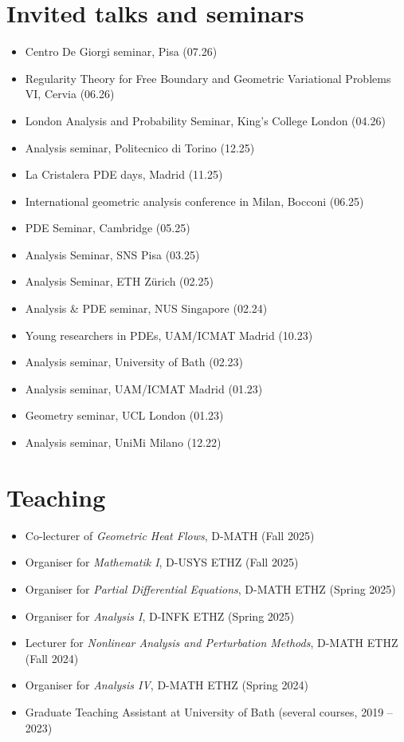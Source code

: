 \documentclass[a4paper,11pt]{article}
\newcommand{\changed}[1]{#1}
\begin{document}
\vspace{5mm}

\section*{Invited talks and seminars}
\noindent
\begin{itemize}
    \item \changed{Centro De Giorgi seminar, Pisa (07.26)}
    \item \changed{Regularity Theory for Free Boundary and Geometric Variational Problems VI, Cervia (06.26)}
    \item \changed{London Analysis and Probability Seminar, King's College London (04.26)}
    \item Analysis seminar, Politecnico di Torino (12.25)
    \item La Cristalera PDE days, Madrid (11.25)
    \item International geometric analysis conference in Milan, Bocconi (06.25)
    \item PDE Seminar, Cambridge (05.25)
    \item Analysis Seminar, SNS Pisa (03.25)
    \item Analysis Seminar, ETH Z\"urich (02.25)
    \item Analysis \& PDE seminar, NUS Singapore (02.24)
    \item Young researchers in PDEs, UAM/ICMAT Madrid (10.23)
    \item Analysis seminar, University of Bath (02.23)
    \item Analysis seminar, UAM/ICMAT Madrid (01.23)
    \item Geometry seminar, UCL London (01.23)
    \item Analysis seminar, UniMi Milano (12.22)
\end{itemize}

\vspace{5mm}

\section*{Teaching}
\noindent
\begin{itemize}
    \item Co-lecturer of \emph{Geometric Heat Flows}, D-MATH (Fall 2025)
    \item Organiser for \emph{Mathematik I}, D-USYS ETHZ (Fall 2025)
    \item Organiser for \emph{Partial Differential Equations}, D-MATH ETHZ (Spring 2025)
    \item Organiser for \emph{Analysis I}, D-INFK ETHZ (Spring 2025)
    \item Lecturer for \emph{Nonlinear Analysis and Perturbation Methods}, D-MATH ETHZ (Fall 2024)
    \item Organiser for \emph{Analysis IV}, D-MATH ETHZ (Spring 2024)
    \item Graduate Teaching Assistant at University of Bath (several courses, 2019 -- 2023)
\end{itemize}
\end{document}
